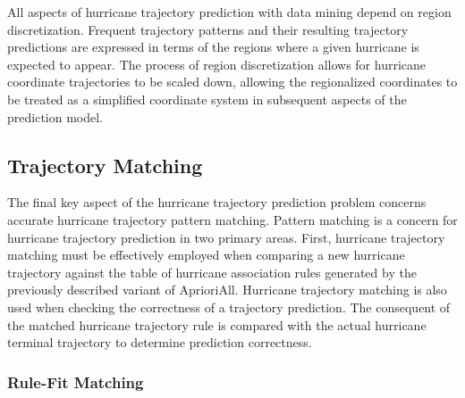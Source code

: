\documentclass[12pt,conference]{IEEEtran}
\begin{document}
All aspects of hurricane trajectory prediction with data mining depend on region discretization. Frequent trajectory patterns and their resulting trajectory predictions are expressed in terms of the regions where a given hurricane is expected to appear. The process of region discretization allows for hurricane coordinate trajectories to be scaled down, allowing the regionalized coordinates to be treated as a simplified coordinate system in subsequent aspects of the prediction model.

\subsection{Trajectory Matching}

The final key aspect of the hurricane trajectory prediction problem concerns accurate hurricane trajectory pattern matching. Pattern matching is a concern for hurricane trajectory prediction in two primary areas. First, hurricane trajectory matching must be effectively employed when comparing a new hurricane trajectory against the table of hurricane association rules generated by the previously described variant of AprioriAll. Hurricane trajectory matching is also used when checking the correctness of a trajectory prediction. The consequent of the matched hurricane trajectory rule is compared with the actual hurricane terminal trajectory to determine prediction correctness.

\subsubsection{Rule-Fit Matching}
\end{document}

